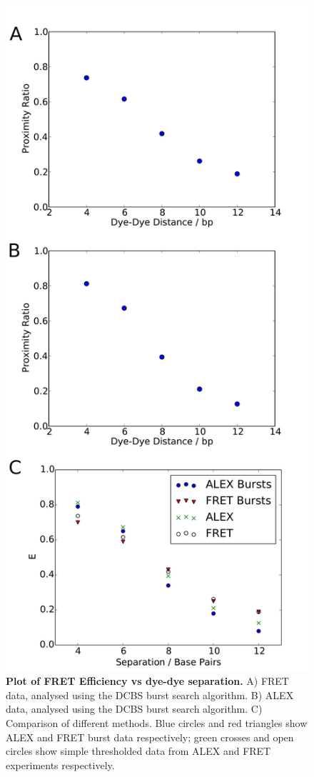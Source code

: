 \begin{figure}[!ht]
   \begin{center}
      \includegraphics*[clip=true, width=6in]{pyFRET/Bp_vs_E.pdf}
      \caption{{\bf Plot of FRET Efficiency vs dye-dye separation.} A) FRET data, analysed using the DCBS burst search algorithm. B) ALEX data, analysed using the DCBS burst search algorithm. C) Comparison of different methods. Blue circles and red triangles show ALEX and FRET burst data respectively; green crosses and open circles show simple thresholded data from ALEX and FRET experiments respectively.}
      \label{fig:fig6_Eplots}
   \end{center}
\end{figure}

